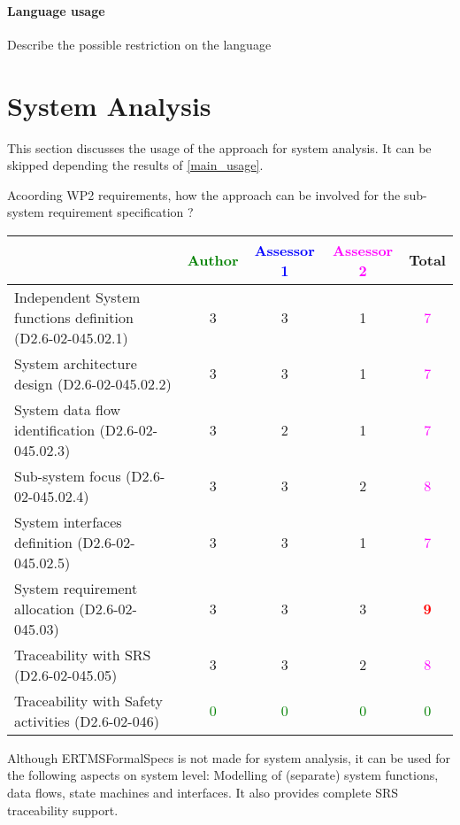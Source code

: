 \paragraph{Language usage} Describe the possible restriction on the language

\section{System Analysis}
This section discusses the usage of the approach for system analysis.
It can be skipped depending the results of \ref{main_usage}.

Acoording WP2 requirements, how the approach can be involved for the sub-system requirement specification ?

\begin{tabular}{|l | c | c | c | c|}
\hline
& \textcolor{green}{Author} & \textcolor{blue}{Assessor 1} & \textcolor{magenta}{Assessor 2} & Total \\
\hline
Independent System functions definition (D2.6-02-045.02.1)  & 3    & 3    & 1    & \textcolor{magenta}{7}  \\
\hline 
System architecture design (D2.6-02-045.02.2) & 3    & 3    & 1    & \textcolor{magenta}{7} \\
\hline
System data flow identification (D2.6-02-045.02.3)  & 3    & 2    & 1    & \textcolor{magenta}{7} \\
\hline
Sub-system focus (D2.6-02-045.02.4)  & 3    & 3    & 2    & \textcolor{magenta}{8} \\
\hline
System interfaces definition (D2.6-02-045.02.5)  & 3    & 3    & 1    & \textcolor{magenta}{7} \\
\hline
System requirement allocation (D2.6-02-045.03)  & 3    & 3    & 3    & \textcolor{red}{\textbf{9}} \\
\hline
Traceability with SRS (D2.6-02-045.05)  & 3    & 3    & 2    & \textcolor{magenta}{8} \\
\hline
Traceability with Safety activities (D2.6-02-046)  & \textcolor{green}{0} & \textcolor{green}{0} & \textcolor{green}{0} & \textcolor{green}{0} \\
\hline
\end{tabular}

\begin{author_comment}
Although ERTMSFormalSpecs is not made for system analysis, it can be used for the following aspects on system level: Modelling of (separate) system functions, data flows, state machines and interfaces. It also provides complete SRS traceability support.  
\end{author_comment}

